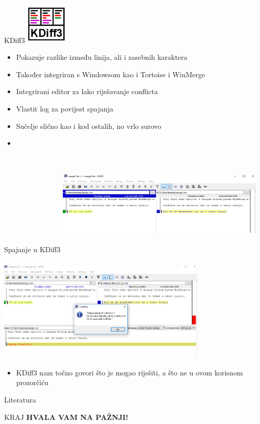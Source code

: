\documentclass[10pt]{beamer}
\begin{document}
\begin{frame}{KDiff3}
    \includegraphics[width=2cm, height=2cm]{kdiff1.png}
    \begin{itemize}
        \item Pokazuje razlike između linija, ali i zasebnih karaktera
        \item Također integriran s Windowsom kao i Tortoise i WinMerge
        \item Integrirani editor za lako riješavanje conflicta
        \item Vlastit log za povijest spajanja
        \item Sučelje slično kao i kod ostalih, no vrlo surovo
        \item \cite{kdiff3}
    \end{itemize}
\end{frame}
\begin{frame}{Spajanje u KDiff3}
    \includegraphics[width=10cm, height=5cm]{kdiff2.png}
    
\end{frame}
    \begin{frame}
    \includegraphics[width=10cm, height=5cm]{kdiff3.png}
    \begin{itemize}
        \item KDiff3 nam točno govori što je mogao riješiti, a što ne u ovom korisnom prozorčiću
    \end{itemize}
    
\end{frame}

\begin{frame}[allowframebreaks]{Literatura}


  \printbibliography

\end{frame}

\begin{frame}{KRAJ}
\textbf{HVALA VAM NA PAŽNJI!}
\end{frame}
\end{document}

